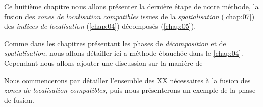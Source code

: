 Ce huitième chapitre nous allons présenter la dernière étape de notre
méthode, la fusion des \emph{zones de localisation compatibles} issues
de la \emph{spatialisation} (\autoref{chap:07}) des \emph{indices de
  localisation} (\autoref{chap:04}) décomposés (\autoref{chap:05}).

Comme dans les chapitres présentant les phases de \emph{décomposition}
et de \emph{spatialisation,} nous allons détailler ici a méthode
ébauchée dans le \autoref{chap:04}. Cependant nous allons ajouter une
discussion sur la manière de 

Nous commencerons par détailler l'ensemble des XX nécessaires à la
fusion des \emph{zones de localisation compatibles,} puis nous
présenterons un exemple de la phase de fusion.

